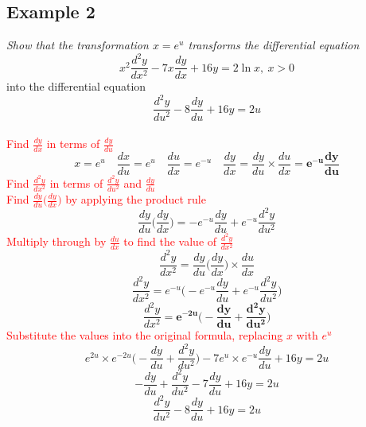 \documentclass{article}[18pt]
\begin{document}
\subsection{Example 2}
\textit{Show that the transformation $x=e^u$ transforms the differential equation}
\begin{equation}\label{eq2:1}
x^2\frac{d^2y}{dx^2}-7x\frac{dy}{dx}+16y=2\ln x, \ x>0
\end{equation}
into the differential equation
\begin{equation}\label{eq2:2}
\frac{d^2y}{du^2}-8\frac{dy}{du}+16y=2u
\end{equation}
\\
\textcolor{red}{\large Find $\frac{dy}{dx}$ in terms of $\frac{dy}{du}$}
$$x=e^u \quad \frac{dx}{du}=e^u \quad \frac{du}{dx}=e^{-u} \quad 
\frac{dy}{dx}=\frac{dy}{du}\times\frac{du}{dx}=\mathbf{e^{-u}\frac{dy}{du}}
$$
\textcolor{red}{\large Find $\frac{d^2y}{dx^2}$ in terms of $\frac{d^2y}{du^2}$ and $\frac{dy}{du}$}\\
\textcolor{red}{Find $\frac{dy}{du}\Big(\frac{dy}{dx}\Big)$ by applying the product rule}
$$\frac{dy}{du}\Big(\frac{dy}{dx}\Big)=-e^{-u}\frac{dy}{du}+e^{-u}\frac{d^2y}{du^2}$$
\textcolor{red}{Multiply through by $\frac{du}{dx}$ to find the value of $\frac{d^2y}{dx^2}$}
$$\frac{d^2y}{dx^2}=\frac{dy}{du}\Big(\frac{dy}{dx}\Big)\times\frac{du}{dx}$$
$$\frac{d^2y}{dx^2}=e^{-u}\Big(-e^{-u}\frac{dy}{du}+e^{-u}\frac{d^2y}{du^2}\Big)$$
$$\frac{d^2y}{dx^2}=\mathbf{e^{-2u}\Big(-\frac{dy}{du}+\frac{d^2y}{du^2}\Big)}$$
\textcolor{red}{Substitute the values into the original formula, replacing $x$ with $e^u$}
$$e^{2u}\times e^{-2u}\Big(-\frac{dy}{du}+\frac{d^2y}{du^2}\Big)-7e^u\times e^{-u}\frac{dy}{du}+16y=2u$$
$$-\frac{dy}{du}+\frac{d^2y}{du^2}-7\frac{dy}{du}+16y=2u$$
$$\frac{d^2y}{du^2}-8\frac{dy}{du}+16y=2u$$
\end{document}
